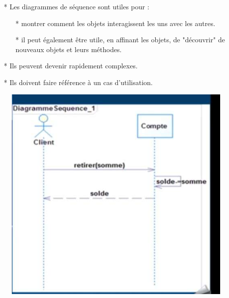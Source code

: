 \documentclass[12pt]{article}
\begin{document}
\begin{itemize}
	\item[*] Les diagrammes de séquence sont utiles pour :
	\begin{itemize}
		\item[*] montrer comment les objets interagissent les uns avec les autres.
		\item[* ] il peut également être utile, en affinant les objets, de "découvrir" de nouveaux objets et leurs méthodes.
	\end{itemize}
	\item[* ] Ils peuvent devenir rapidement complexes.
	\item[* ] Ils doivent faire référence à un cas d'utilisation.
\end{itemize}
\newpage
\begin{figure}[!hbtp]
	\centering
	\includegraphics[scale=0.5]{Capture11.jpg}
\end{figure}
\end{document}
